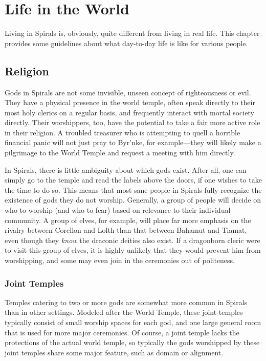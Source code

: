 \chapter{Life in the World}
Living in Spirals is, obviously, quite different from living in real life.
This chapter provides some guidelines about what day-to-day life is like for various people.


\begin{multicols}{2}
\section{Religion}
Gods in Spirals are not some invisible, unseen concept of righteousness or evil.
They have a physical presence in the world temple, often speak directly to their most holy clerics on a regular basis, and frequently interact with mortal society directly.
Their worshippers, too, have the potential to take a fair more active role in their religion.
A troubled treasurer who is attempting to quell a horrible financial panic will not just pray to Byr’nke, for example---they will likely make a pilgrimage to the World Temple and request a meeting with him directly.

In Spirals, there is little ambiguity about which gods exist.
After all, one can simply go to the temple and read the labels above the doors, if one wishes to take the time to do so.
This means that most sane people in Spirals fully recognize the existence of gods they do not worship.
Generally, a group of people will decide on who to worship (and who to fear) based on relevance to their individual community.
A group of elves, for example, will place far more emphasis on the rivalry between Corellon and Lolth than that between Bahamut and Tiamat, even though they \textit{know} the draconic deities also exist.
If a dragonborn cleric were to visit this group of elves, it is highly unlikely that they would prevent him from worshipping, and some may even join in the ceremonies out of politeness.

\subsection{Joint Temples}
Temples catering to two or more gods are somewhat more common in Spirals than in other settings.
Modeled after the World Temple, these joint temples typically consist of small worship spaces for each god, and one large general room that is used for more major ceremonies.
Of course, a joint temple lacks the protections of the actual world temple, so typically the gods worshipped by these joint temples share some major feature, such as domain or alignment.


\end{multicols}
